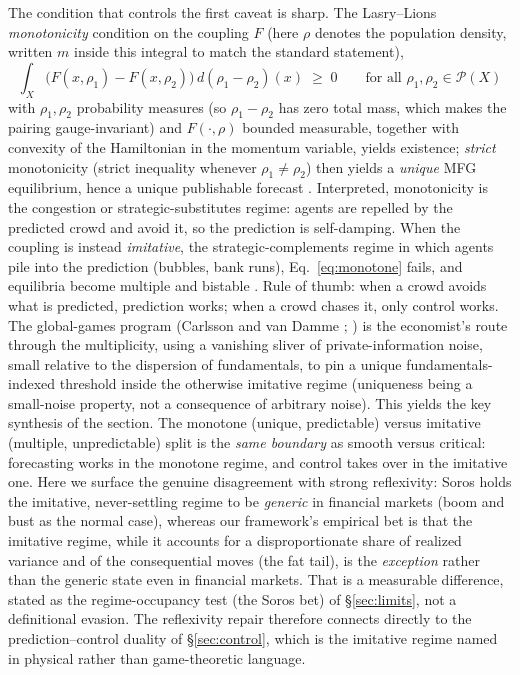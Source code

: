 \documentclass[11pt]{article}
\begin{document}
The condition that controls the first caveat is sharp. The Lasry--Lions \emph{monotonicity} condition on the coupling $F$ (here $\rho$ denotes the population density, written $m$ inside this integral to match the standard statement),
\begin{equation}
\int_X \big(F(x,\rho_1)-F(x,\rho_2)\big)\, d(\rho_1-\rho_2)(x) \;\geq\; 0
\qquad \text{for all } \rho_1,\rho_2\in\mathcal{P}(X)
\label{eq:monotone}
\end{equation}
with $\rho_1,\rho_2$ probability measures (so $\rho_1-\rho_2$ has zero total mass, which makes the pairing gauge-invariant) and $F(\cdot,\rho)$ bounded measurable, together with convexity of the Hamiltonian in the momentum variable, yields existence; \emph{strict} monotonicity (strict inequality whenever $\rho_1\neq\rho_2$) then yields a \emph{unique} MFG equilibrium, hence a unique publishable forecast \cite{lasrylions2007,carmonadelarue2018}. Interpreted, monotonicity is the congestion or strategic-substitutes regime: agents are repelled by the predicted crowd and avoid it, so the prediction is self-damping. When the coupling is instead \emph{imitative}, the strategic-complements regime in which agents pile into the prediction (bubbles, bank runs), Eq.~\eqref{eq:monotone} fails, and equilibria become multiple and bistable \cite{bardifischer2019}. Rule of thumb: when a crowd avoids what is predicted, prediction works; when a crowd chases it, only control works. The global-games program (Carlsson and van Damme \cite{carlssonvandamme1993}; \cite{morrisshin1998,goldsteinpauzner2005}) is the economist's route through the multiplicity, using a vanishing sliver of private-information noise, small relative to the dispersion of fundamentals, to pin a unique fundamentals-indexed threshold inside the otherwise imitative regime (uniqueness being a small-noise property, not a consequence of arbitrary noise). This yields the key synthesis of the section. The monotone (unique, predictable) versus imitative (multiple, unpredictable) split is the \emph{same boundary} as smooth versus critical: forecasting works in the monotone regime, and control takes over in the imitative one. Here we surface the genuine disagreement with strong reflexivity: Soros \cite{soros1987} holds the imitative, never-settling regime to be \emph{generic} in financial markets (boom and bust as the normal case), whereas our framework's empirical bet is that the imitative regime, while it accounts for a disproportionate share of realized variance and of the consequential moves (the fat tail), is the \emph{exception} rather than the generic state even in financial markets. That is a measurable difference, stated as the regime-occupancy test (the Soros bet) of \S\ref{sec:limits}, not a definitional evasion. The reflexivity repair therefore connects directly to the prediction--control duality of \S\ref{sec:control}, which is the imitative regime named in physical rather than game-theoretic language.
\end{document}
